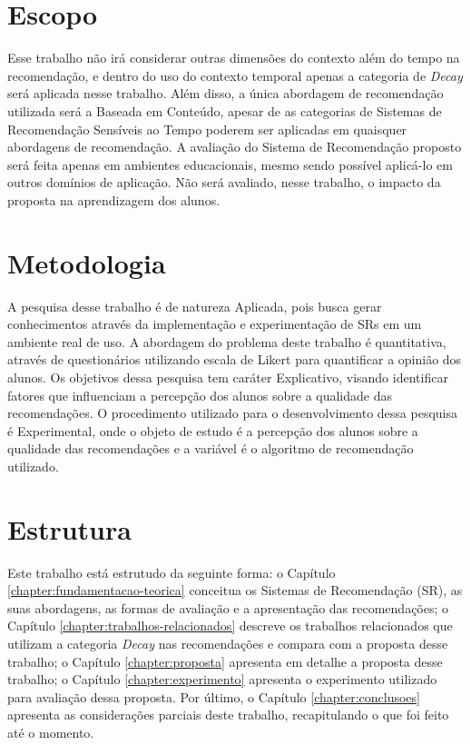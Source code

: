 \section{Escopo}

Esse trabalho não irá considerar outras dimensões do contexto além do tempo na recomendação, e dentro do uso do contexto
temporal apenas a categoria de \textit{Decay} será aplicada nesse trabalho. Além disso, a única abordagem de recomendação
utilizada será a Baseada em Conteúdo, apesar de as categorias de Sistemas de Recomendação Sensíveis ao Tempo poderem ser
aplicadas em quaisquer abordagens de recomendação. A avaliação do Sistema de Recomendação proposto será feita apenas em
ambientes educacionais, mesmo sendo possível aplicá-lo em outros domínios de aplicação. Não será avaliado, nesse trabalho,
o impacto da proposta na aprendizagem dos alunos.

\section{Metodologia}

A pesquisa desse trabalho é de natureza Aplicada, pois busca gerar conhecimentos através da implementação e experimentação
de SRs em um ambiente real de uso. A abordagem do problema deste trabalho é quantitativa, através de questionários utilizando
escala de Likert para quantificar a opinião dos alunos. Os objetivos dessa pesquisa tem caráter Explicativo, visando
identificar fatores que influenciam a percepção dos alunos sobre a qualidade das recomendações. O procedimento utilizado
para o desenvolvimento dessa pesquisa é Experimental, onde o objeto de estudo é a percepção dos alunos sobre a qualidade
das recomendações e a variável é o algoritmo de recomendação utilizado.

\section{Estrutura}

Este trabalho está estrutudo da seguinte forma: o Capítulo \ref{chapter:fundamentacao-teorica} conceitua os Sistemas de
Recomendação (SR), as suas abordagens, as formas de avaliação e a apresentação das recomendações; o Capítulo \ref{chapter:trabalhos-relacionados}
descreve os trabalhos relacionados que utilizam a categoria \textit{Decay} nas recomendações e compara com a proposta desse
trabalho; o Capítulo \ref{chapter:proposta} apresenta em detalhe a proposta desse trabalho; o Capítulo \ref{chapter:experimento}
apresenta o experimento utilizado para avaliação dessa proposta. Por último, o Capítulo \ref{chapter:conclusoes} apresenta
as considerações parciais deste trabalho, recapitulando o que foi feito até o momento.


